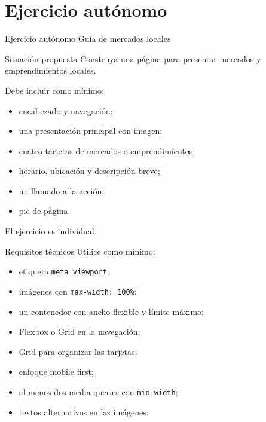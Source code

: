 \documentclass[aspectratio=169,11pt]{beamer}
\begin{document}
    \section{Ejercicio autónomo}

    \SectionSlide
    {Ejercicio autónomo}
    {Guía de mercados locales}

    \begin{frame}{Situación propuesta}
        Construya una página para presentar mercados y emprendimientos locales.

        Debe incluir como mínimo:

        \begin{itemize}
            \item encabezado y navegación;
            \item una presentación principal con imagen;
            \item cuatro tarjetas de mercados o emprendimientos;
            \item horario, ubicación y descripción breve;
            \item un llamado a la acción;
            \item pie de página.
        \end{itemize}

        El ejercicio es individual.
    \end{frame}

    \begin{frame}{Requisitos técnicos}
        Utilice como mínimo:

        \begin{itemize}
            \item etiqueta \texttt{meta viewport};
            \item imágenes con \texttt{max-width: 100\%};
            \item un contenedor con ancho flexible y límite máximo;
            \item Flexbox o Grid en la navegación;
            \item Grid para organizar las tarjetas;
            \item enfoque mobile first;
            \item al menos dos media queries con \texttt{min-width};
            \item textos alternativos en las imágenes.
        \end{itemize}
    \end{frame}
\end{document}
